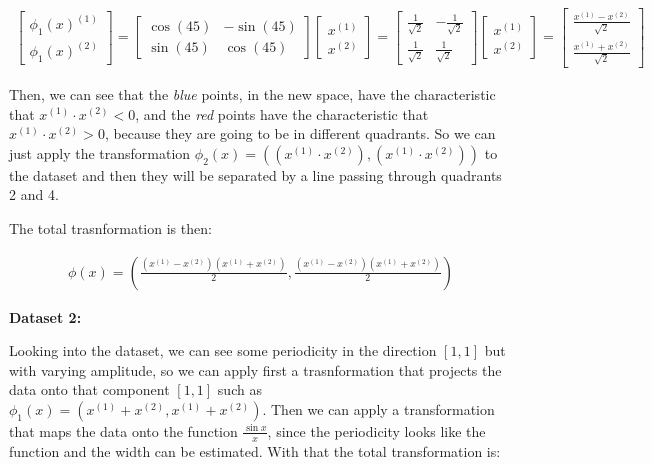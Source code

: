 \documentclass[12pt,a4paper,oneside]{paper}
\begin{document}
\begin{align*}
    \begin{bmatrix}
        \phi_1(x)^{(1)} \\
        \phi_1(x)^{(2)}
    \end{bmatrix} =
    \begin{bmatrix}
        \cos(45) & -\sin(45) \\
        \sin(45) & \cos(45)
    \end{bmatrix}
    \begin{bmatrix}
        x^{(1)} \\
        x^{(2)}
    \end{bmatrix}
    =
    \begin{bmatrix}
        \frac{1}{\sqrt{2}} & -\frac{1}{\sqrt{2}} \\
        \frac{1}{\sqrt{2}} & \frac{1}{\sqrt{2}}
    \end{bmatrix}
    \begin{bmatrix}
        x^{(1)} \\
        x^{(2)}
    \end{bmatrix}
    =
    \begin{bmatrix}
        \frac{x^{(1)} - x^{(2)}}{\sqrt{2}} \\
        \frac{x^{(1)} + x^{(2)}}{\sqrt{2}}
    \end{bmatrix}
\end{align*}

Then, we can see that the \textit{blue} points, in the new space, have the characteristic that $x^{(1)} \cdot x^{(2)} < 0$, and the \textit{red} points have the characteristic that $x^{(1)} \cdot x^{(2)} > 0$, because
they are going to be in different quadrants.
So we can just apply the transformation $\phi_2(x) = ((x^{(1)} \cdot x^{(2)}), (x^{(1)} \cdot x^{(2)}))$ to the dataset and then they will be separated by a line
passing through quadrants 2 and 4.

The total trasnformation is then:

\begin{align*}
    \phi(x) = (\frac{(x^{(1)} - x^{(2)})(x^{(1)} + x^{(2)})}{2}, \frac{(x^{(1)} - x^{(2)})(x^{(1)} + x^{(2)})}{2})
\end{align*}

\textbf{Dataset 2:}

Looking into the dataset, we can see some periodicity in the direction $[1, 1]$ but with varying amplitude, so we can apply
first a trasnformation that projects the data onto that component $[1, 1]$ such as $\phi_1(x) = (x^{(1)} + x^{(2)}, x^{(1)} + x^{(2)})$.
Then we can apply a transformation that maps the data onto the function $\frac{\sin x}{x}$, since the periodicity
looks like the function and the width can be estimated. With that the total transformation is:
\end{document}
